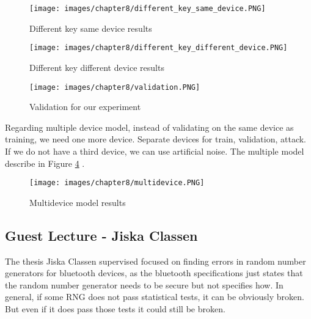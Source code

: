 \begin{figure}
    \centering
    \texttt{[image: images/chapter8/different\_key\_same\_device.PNG]}
    \caption{Different key same device results}
    \label{fig:different_key_same_device}
\end{figure}

\begin{figure}
    \centering
    \texttt{[image: images/chapter8/different\_key\_different\_device.PNG]}
    \caption{Different key different device results}
    \label{fig:different_key_differnet_device}
\end{figure}

\begin{figure}
    \centering
    \texttt{[image: images/chapter8/validation.PNG]}
    \caption{Validation for our experiment}
    \label{fig:validation}
\end{figure}

Regarding multiple device model, instead of validating on the same device as training, we need
one more device. Separate devices for train, validation, attack. If we do not have a third device, we can use artificial noise. The multiple model describe in Figure \ref{fig:multidevice} .
 

\begin{figure}
    \centering
    \texttt{[image: images/chapter8/multidevice.PNG]}
    \caption{Multidevice model results}
    \label{fig:multidevice}
\end{figure}
\subsection{Guest Lecture - Jiska Classen}
The thesis Jiska Classen supervised focused on finding errors in random number generators for bluetooth devices, as the bluetooth specifications just states that the random number generator needs to be secure but not specifies how.
In general, if some RNG does not pass statistical tests, it can be obviously broken.
But even if it does pass those tests it could still be broken.\\


